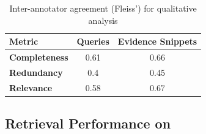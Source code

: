 \begin{table}[hbt!]
\centering
\begin{tabular}{lcc}
\toprule
\textbf{Metric} & \textbf{Queries} & \textbf{Evidence Snippets} \\
\midrule
\textbf{Completeness} & \cellcolor{green!10}0.61 & \cellcolor{green!10}0.66 \\
\textbf{Redundancy} & \cellcolor{yellow!10}0.4 & \cellcolor{yellow!10}0.45 \\
\textbf{Relevance} & \cellcolor{green!10}0.58 & \cellcolor{green!10}0.67 \\
\bottomrule
\end{tabular}
\caption{Inter-annotator agreement (Fleiss’) for qualitative analysis }%
\label{table:agreement}
\vspace{-4em}
\end{table}
\subsection{Retrieval Performance on \quantempplus{} }

\label{5.2}



